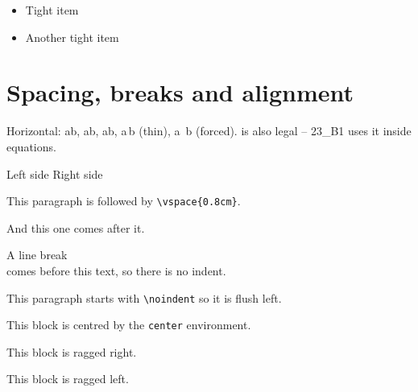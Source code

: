 \documentclass[11pt,a4paper]{article}
\theoremstyle{definition}                   %
\begin{document}
\begin{itemize}[noitemsep, topsep=0pt]
    \item Tight item
    \item Another tight item
\end{itemize}


\section{Spacing, breaks and alignment}

Horizontal: a\hspace{1cm}b, a\quad b, a\qquad b, a$\,$b (thin), a\ b (forced).
\hspace{20px} is also legal -- 23\_B1 uses it inside equations.

Left side \hfill Right side

\medskip
This paragraph is followed by \verb|\vspace{0.8cm}|.
\vspace{0.8cm}

And this one comes after it.

A line break\\comes before this text, so there is no indent.

\noindent This paragraph starts with \verb|\noindent| so it is flush left.

\begin{center}
    This block is centred by the \texttt{center} environment.
\end{center}
\begin{flushleft}
    This block is ragged right.
\end{flushleft}
\begin{flushright}
    This block is ragged left.
\end{flushright}
\end{document}
